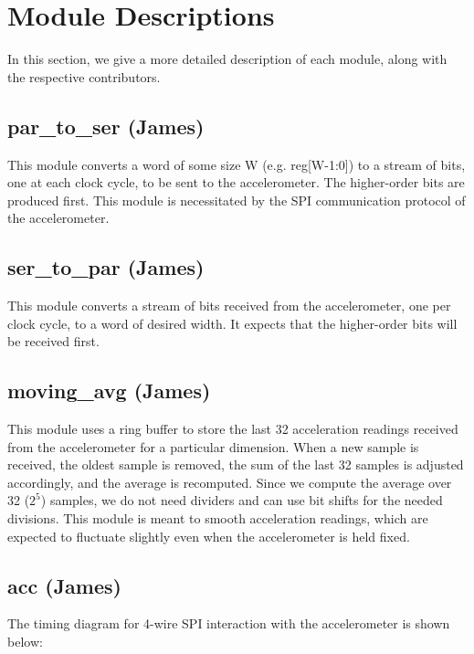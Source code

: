 \documentclass{article}
\begin{document}
\section{Module Descriptions}

In this section, we give a more detailed description of each module, along with the respective contributors.

\subsection{par\_to\_ser (James)}
This module converts a word of some size W (e.g. reg[W-1:0]) to a stream of bits, one at each clock cycle, to be sent to the accelerometer. The higher-order bits are produced first. This module is necessitated by the SPI communication protocol of the accelerometer.

\subsection{ser\_to\_par (James)}
This module converts a stream of bits received from the accelerometer, one per clock cycle, to a word of desired width. It expects that the higher-order bits will be received first.

\subsection{moving\_avg (James)}
This module uses a ring buffer to store the last 32 acceleration readings received from the accelerometer for a particular dimension. When a new sample is received, the oldest sample is removed, the sum of the last 32 samples is adjusted accordingly, and the average is recomputed. Since we compute the average over 32 ($2^5$) samples, we do not need dividers and can use bit shifts for the needed divisions. This module is meant to smooth acceleration readings, which are expected to fluctuate slightly even when the accelerometer is held fixed.

\subsection{acc (James)}
The timing diagram for 4-wire SPI interaction with the accelerometer is shown below:
\end{document}
